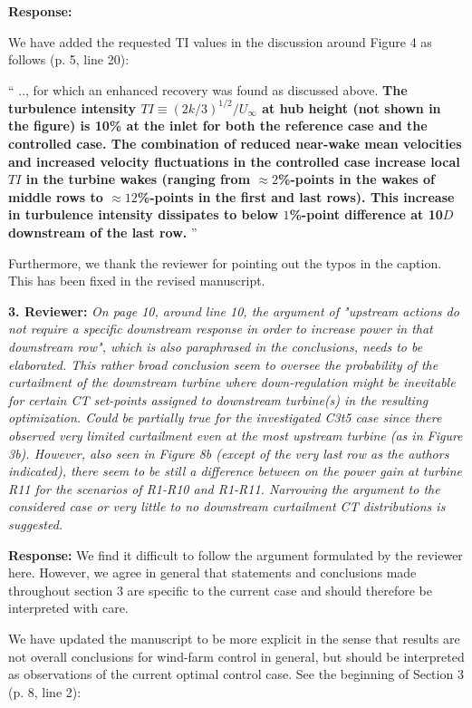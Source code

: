 \documentclass[]{article}
\begin{document}
\textbf{Response: }

We have added the requested TI values in the discussion around Figure 4 as follows (p. 5, line 20):

``
.., for which an enhanced recovery was found as discussed above. \textbf{The turbulence intensity $TI \equiv (2k/3  )^{1/2}/U_\infty$ at hub height (not shown in the figure) is 10\% at the inlet for both the reference case and the controlled case. The combination of reduced near-wake mean velocities and increased velocity fluctuations in the controlled case increase local $TI$ in the turbine wakes (ranging from $\approx 2$\%-points in the wakes of middle rows to $\approx 12$\%-points in the first and last rows). This increase in turbulence intensity dissipates to below $1$\%-point difference at 10$D$ downstream of the last row.}
''

Furthermore, we thank the reviewer for pointing out the typos in the caption. This has been fixed in the revised manuscript.

\dotfill

\textbf{3. Reviewer: } \textit{On page 10, around line 10, the argument of "upstream actions do not require a
	specific downstream response in order to increase power in that downstream row",
	which is also paraphrased in the conclusions, needs to be elaborated. This rather
	broad conclusion seem to oversee the probability of the curtailment of the downstream
	turbine where down-regulation might be inevitable for certain CT set-points assigned
	to downstream turbine(s) in the resulting optimization. Could be partially true for the
	investigated C3t5 case since there observed very limited curtailment even at the most
	upstream turbine (as in Figure 3b). However, also seen in Figure 8b (except of the
	very last row as the authors indicated), there seem to be still a difference between on
	the power gain at turbine R11 for the scenarios of R1-R10 and R1-R11. Narrowing the argument to the considered case or very little to no downstream curtailment CT
	distributions is suggested.}

\textbf{Response: } We find it difficult to follow the argument formulated by the reviewer here. However, we agree in general that statements and conclusions made throughout section 3 are specific to the current case and should therefore be interpreted with care. 

We have updated the manuscript to be more explicit in the sense that results are not overall conclusions for wind-farm control in general, but should be interpreted as observations of the current optimal control case. See the beginning of Section 3 (p. 8, line 2):
\end{document}
